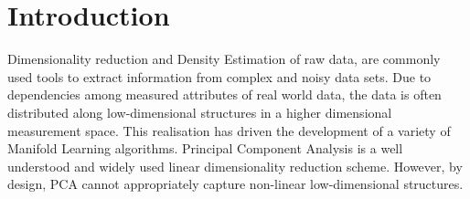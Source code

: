\section{Introduction}


Dimensionality reduction and Density Estimation of raw data, are commonly used tools to extract information from complex and noisy data sets.
Due to dependencies among measured attributes of real world data,
the data is often distributed along low-dimensional structures in a higher dimensional measurement space.
This realisation has driven the development of a variety of Manifold Learning algorithms.
Principal Component Analysis \citep[PCA, ][]{Pearson1901} is a well understood and widely used linear dimensionality reduction scheme. 
However, by design, PCA cannot appropriately capture non-linear low-dimensional structures.



